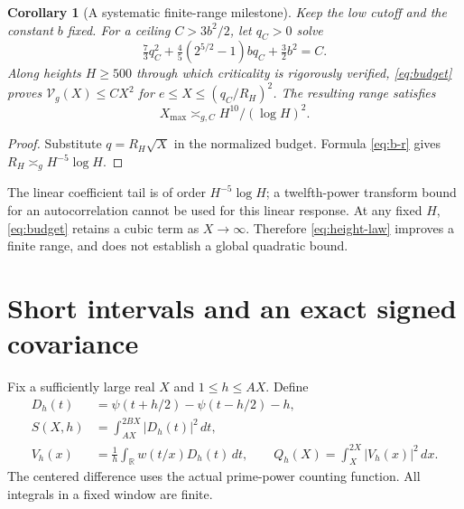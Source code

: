 \documentclass[11pt]{article}
\newtheorem{corollary}[theorem]{Corollary}
\theoremstyle{remark}
\newcommand{\dd}{\,d}
\newcommand{\R}{\mathbb R}
\newcommand{\Vcal}{\mathcal V_g}
\numberwithin{equation}{section}
\begin{document}
\begin{corollary}[A systematic finite-range milestone]\label{cor:height}
Keep the low cutoff and the constant $b$ fixed. For a ceiling
$C>3b^2/2$, let $q_C>0$ solve
\[
\tfrac73q_C^2+\tfrac45(2^{5/2}-1)bq_C+\tfrac32b^2=C.
\]
Along heights $H\ge500$ through which criticality is rigorously verified,
\eqref{eq:budget} proves $\Vcal(X)\le CX^2$ for
$e\le X\le(q_C/R_H)^2$. The resulting range satisfies
\begin{equation}\label{eq:height-law}
X_{\max}\asymp_{g,C} H^{10}/(\log H)^2.
\end{equation}
\end{corollary}
\begin{proof}
Substitute $q=R_H\sqrt X$ in the normalized budget. Formula
\eqref{eq:b-r} gives $R_H\asymp_g H^{-5}\log H$.
\end{proof}
The linear coefficient tail is of order $H^{-5}\log H$; a
twelfth-power transform bound for an autocorrelation cannot be used
for this linear response. At any fixed $H$, \eqref{eq:budget} retains
a cubic term as $X\to\infty$. Therefore \eqref{eq:height-law} improves
a finite range, and does not establish a global quadratic bound.

\section{Short intervals and an exact signed covariance}\label{sec:arithmetic}
Fix a sufficiently large real $X$ and $1\le h\le AX$. Define
\begin{equation}\label{eq:short-defs}
\begin{split}
D_h(t)&=\psi(t+h/2)-\psi(t-h/2)-h,\\
S(X,h)&=\int_{AX}^{2BX}|D_h(t)|^2\dd t,\\
V_h(x)&=\frac1h\int_\R w(t/x)D_h(t)\dd t,\qquad
Q_h(X)=\int_X^{2X}|V_h(x)|^2\dd x.
\end{split}
\end{equation}
The centered difference uses the actual prime-power counting function.
All integrals in a fixed window are finite.
\end{document}
